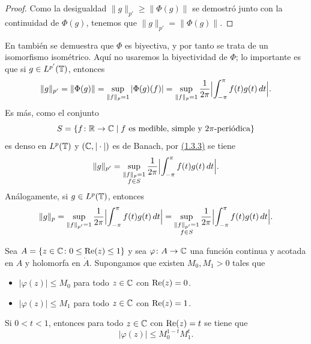 \documentclass[a4paper, 12pt, oneside]{book}
\begin{document}
\begin{proof}
    Como la desigualdad $\|g\|_{p'} \geq \|\Phi(g)\|$ se demostró junto con la continuidad de $\Phi(g)$, tenemos que $\|g\|_{p'} = \|\Phi(g)\|$.
\end{proof}

En \cite{folland} también se demuestra que $\Phi$ es biyectiva, y por tanto se trata de un isomorfismo isométrico. Aquí no usaremos la biyectividad de $\Phi$; lo importante es que si $g \in L^{p'}(\mathbb T)$, entonces
\[
    \|g\|_{p'} = \|\Phi(g)\| = \sup_{\|f\|_p = 1} |\Phi(g)(f)| = \sup_{\|f\|_p=1}\frac{1}{2\pi}\Bigl|\int_{-\pi}^{\pi} f(t)g(t) \, dt\Bigr|.
\]
Es más, como el conjunto 
\[S = \{f \colon \mathbb R \to \mathbb C \mid f \textup{ es medible, simple y } 2\pi \textup{-periódica}\}\]
es denso en $L^{p}(\mathbb T)$ y $(\mathbb C,|\cdot|)$ es de Banach, por \hyperref[1.3.3]{\color{blue}(1.3.3)} se tiene
\begin{equation*}
    \|g\|_{p'} = \sup_{\substack{\|f\|_{p}=1 \\ f \in S}}\frac{1}{2\pi}\Bigl|\int_{-\pi}^{\pi} f(t)g(t) \, dt\Bigr|.
\end{equation*}
Análogamente, si $g\in L^p(\mathbb T)$, entonces
\begin{equation}\label{3.2.2}
    \|g\|_{p} = \sup_{\|f\|_{p'}=1}\frac{1}{2\pi}\Bigl|\int_{-\pi}^{\pi} f(t)g(t) \, dt\Bigr| = \sup_{\substack{\|f\|_{p'}=1 \\ f \in S}}\frac{1}{2\pi}\Bigl|\int_{-\pi}^{\pi} f(t)g(t) \, dt\Bigr|.
\end{equation}

\begin{lemma}\label{3.2.3}
    Sea $A = \{z \in \mathbb C \colon 0 \leq \textup{Re}(z) \leq 1\}$ y sea $\varphi \colon A \to \mathbb C$ una función continua y acotada en $A$ y holomorfa en $\mathring{A}$. Supongamos que existen $M_0,M_1>0$ tales que
    \begin{itemize}
        \item $|\varphi(z)| \leq M_0$ para todo $z \in \mathbb C$ con $\textup{Re}(z) = 0$.
        \item $|\varphi(z)| \leq M_1$ para todo $z \in \mathbb C$ con $\textup{Re}(z) = 1$.
    \end{itemize}
    Si $0 < t < 1$, entonces para todo $z \in \mathbb C$ con $\textup{Re}(z) = t$ se tiene que
    \[|\varphi(z)| \leq M_0^{1-t}M_1^t.\]
\end{lemma}
\end{document}
